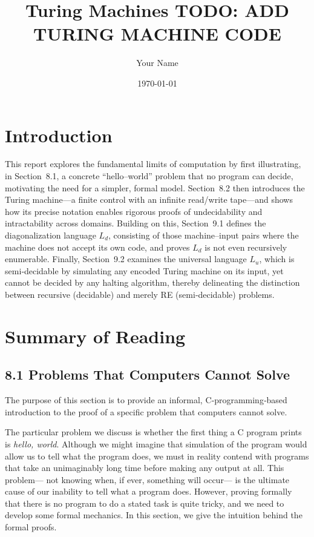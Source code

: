 \documentclass{article}
\title{Turing Machines TODO: ADD TURING MACHINE CODE}
\author{Your Name}
\date{\today}
\begin{document}
\maketitle

\tableofcontents

\section{Introduction}
This report explores the fundamental limits of computation by first illustrating, in Section 8.1, a concrete “hello–world” problem that no program can decide, motivating the need for a simpler, formal model. Section 8.2 then introduces the Turing machine—a finite control with an infinite read/write tape—and shows how its precise notation enables rigorous proofs of undecidability and intractability across domains. Building on this, Section 9.1 defines the diagonalization language \(L_{d}\), consisting of those machine–input pairs where the machine does not accept its own code, and proves \(L_{d}\) is not even recursively enumerable. Finally, Section 9.2 examines the universal language \(L_{u}\), which is semi‐decidable by simulating any encoded Turing machine on its input, yet cannot be decided by any halting algorithm, thereby delineating the distinction between recursive (decidable) and merely RE (semi‐decidable) problems.  

\newpage

\section{Summary of Reading}
\subsection*{8.1 Problems That Computers Cannot Solve}
The purpose of this section is to provide an informal, C‐programming‐based introduction to the proof of a specific problem that computers cannot solve.

The particular problem we discuss is whether the first thing a C program prints is \emph{hello, world}. Although we might imagine that simulation of the program would allow us to tell what the program does, we must in reality contend with programs that take an unimaginably long time before making any output at all. This problem— not knowing when, if ever, something will occur— is the ultimate cause of our inability to tell what a program does. However, proving formally that there is no program to do a stated task is quite tricky, and we need to develop some formal mechanics. In this section, we give the intuition behind the formal proofs.
\end{document}
